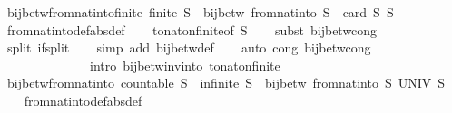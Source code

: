 \begin{isabellebody}
\endisatagproof
{\isafoldproof}%
%
\isadelimproof
\isanewline
%
\endisadelimproof
\isanewline
{}\isamarkupfalse%
\ bij{\isacharunderscore}betw{\isacharunderscore}from{\isacharunderscore}nat{\isacharunderscore}into{\isacharunderscore}finite{\isacharcolon}\ {\isachardoublequoteopen}finite\ S\ {\isasymLongrightarrow}\ bij{\isacharunderscore}betw\ {\isacharparenleft}from{\isacharunderscore}nat{\isacharunderscore}into\ S{\isacharparenright}\ {\isacharbraceleft}{\isachardot}{\isachardot}{\isacharless}\ card\ S{\isacharbraceright}\ S{\isachardoublequoteclose}\isanewline
%
\isadelimproof
\ \ %
\endisadelimproof
%
\isatagproof
{}\isamarkupfalse%
\ from{\isacharunderscore}nat{\isacharunderscore}into{\isacharunderscore}def{\isacharbrackleft}abs{\isacharunderscore}def{\isacharbrackright}\isanewline
\ \ \isamarkupfalse%
\ to{\isacharunderscore}nat{\isacharunderscore}on{\isacharunderscore}finite{\isacharbrackleft}of\ S{\isacharbrackright}\isanewline
\ \ \isamarkupfalse%
\ {\isacharparenleft}subst\ bij{\isacharunderscore}betw{\isacharunderscore}cong{\isacharparenright}\isanewline
\ \ \isamarkupfalse%
\ {\isacharparenleft}split\ if{\isacharunderscore}split{\isacharparenright}\isanewline
\ \ \isamarkupfalse%
\ {\isacharparenleft}simp\ add{\isacharcolon}\ bij{\isacharunderscore}betw{\isacharunderscore}def{\isacharparenright}\isanewline
\ \ \isamarkupfalse%
\ {\isacharparenleft}auto\ cong{\isacharcolon}\ bij{\isacharunderscore}betw{\isacharunderscore}cong\isanewline
\ \ \ \ \ \ \ \ \ \ \ \ \ \ intro{\isacharcolon}\ bij{\isacharunderscore}betw{\isacharunderscore}inv{\isacharunderscore}into\ to{\isacharunderscore}nat{\isacharunderscore}on{\isacharunderscore}finite{\isacharparenright}\isanewline
\ \ \isamarkupfalse%
%
\endisatagproof
{\isafoldproof}%
%
\isadelimproof
\isanewline
%
\endisadelimproof
\isanewline
{}\isamarkupfalse%
\ bij{\isacharunderscore}betw{\isacharunderscore}from{\isacharunderscore}nat{\isacharunderscore}into{\isacharcolon}\ {\isachardoublequoteopen}countable\ S\ {\isasymLongrightarrow}\ infinite\ S\ {\isasymLongrightarrow}\ bij{\isacharunderscore}betw\ {\isacharparenleft}from{\isacharunderscore}nat{\isacharunderscore}into\ S{\isacharparenright}\ UNIV\ S{\isachardoublequoteclose}\isanewline
%
\isadelimproof
\ \ %
\endisadelimproof
%
\isatagproof
{}\isamarkupfalse%
\ from{\isacharunderscore}nat{\isacharunderscore}into{\isacharunderscore}def{\isacharbrackleft}abs{\isacharunderscore}def{\isacharbrackright}\isanewline

\end{isabellebody}
